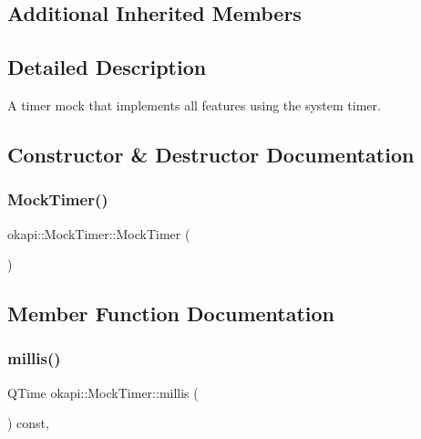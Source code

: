 \subsection*{Additional Inherited Members}


\subsection{Detailed Description}
A timer mock that implements all features using the system timer. 

\subsection{Constructor \& Destructor Documentation}
\mbox{\label{classokapi_1_1MockTimer_af9912c6f000085eb60b57982da81d787}} 
\subsubsection{\texorpdfstring{MockTimer()}{MockTimer()}}
{\footnotesize\ttfamily okapi\+::\+Mock\+Timer\+::\+Mock\+Timer (\begin{DoxyParamCaption}{ }\end{DoxyParamCaption})}



\subsection{Member Function Documentation}
\mbox{\label{classokapi_1_1MockTimer_a8e688820e2fc7c4ec0e86bf9b837bf20}} 
\subsubsection{\texorpdfstring{millis()}{millis()}}
{\footnotesize\ttfamily Q\+Time okapi\+::\+Mock\+Timer\+::millis (\begin{DoxyParamCaption}{ }\end{DoxyParamCaption}) const\hspace{0.3cm}{\ttfamily [override]}, {\ttfamily [virtual]}}



